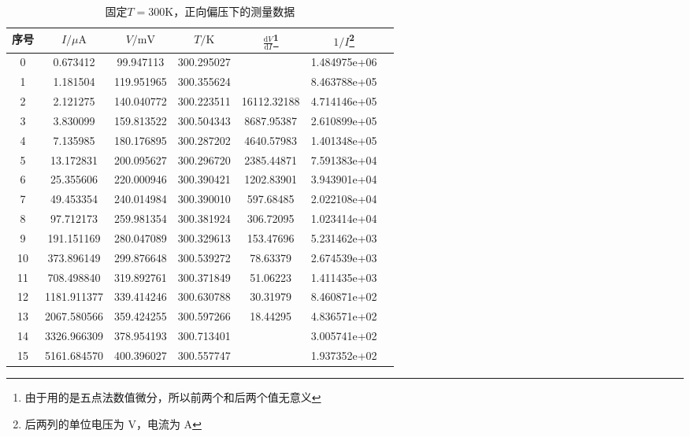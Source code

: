 \documentclass[aps,pre,12pt,preprint,onecolumn,showpacs,showkeys]{revtex4-1}
\def \d {\mathrm d}
\begin{document}
    \begin{table}[ht]
        \caption{\label{tab:V-I2}%
        固定$T=300\mathrm K$，正向偏压下的测量数据}
        \begin{tabular}{|c|c|c|c|c|c|c|}\hline
            序号&$I/\mu \mathrm A$&$V/\mathrm{mV}$&$T/\mathrm K$&$\frac{\d V}{\d I}$\footnote{由于用的是五点法数值微分，所以前两个和后两个值无意义}&$1/I$\footnote{后两列的单位电压为 V，电流为 A}\\\hline
            0  &     0.673412 &   99.947113 &  300.295027 &            &  1.484975e+06 \\\hline1  &     1.181504 &  119.951965 &  300.355624 &            &  8.463788e+05 \\\hline2  &     2.121275 &  140.040772 &  300.223511 &   16112.32188 &  4.714146e+05 \\\hline3  &     3.830099 &  159.813522 &  300.504343 &    8687.95387 &  2.610899e+05 \\\hline4  &     7.135985 &  180.176895 &  300.287202 &    4640.57983 &  1.401348e+05 \\\hline5  &    13.172831 &  200.095627 &  300.296720 &    2385.44871 &  7.591383e+04 \\\hline6  &    25.355606 &  220.000946 &  300.390421 &    1202.83901 &  3.943901e+04 \\\hline7  &    49.453354 &  240.014984 &  300.390010 &     597.68485 &  2.022108e+04 \\\hline8  &    97.712173 &  259.981354 &  300.381924 &     306.72095 &  1.023414e+04 \\\hline9  &   191.151169 &  280.047089 &  300.329613 &     153.47696 &  5.231462e+03 \\\hline10 &   373.896149 &  299.876648 &  300.539272 &      78.63379 &  2.674539e+03 \\\hline11 &   708.498840 &  319.892761 &  300.371849 &      51.06223 &  1.411435e+03 \\\hline12 &  1181.911377 &  339.414246 &  300.630788 &      30.31979 &  8.460871e+02 \\\hline13 &  2067.580566 &  359.424255 &  300.597266 &      18.44295 &  4.836571e+02 \\\hline14 &  3326.966309 &  378.954193 &  300.713401 &   &  3.005741e+02 \\\hline15 &  5161.684570 &  400.396027 &  300.557747 &  &  1.937352e+02 \\\hline
        \end{tabular}
    \end{table}
\end{document}
